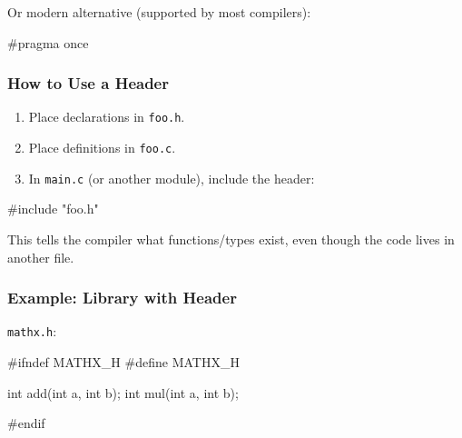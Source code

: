 \documentclass[
  letterpaper,
  DIV=11,
  numbers=noendperiod]{scrreprt}
\newenvironment{Shaded}{\begin{snugshade}}{\end{snugshade}}
\newcommand{\DataTypeTok}[1]{\textcolor[rgb]{0.68,0.00,0.00}{#1}}
\newcommand{\ImportTok}[1]{\textcolor[rgb]{0.00,0.46,0.62}{#1}}
\newcommand{\NormalTok}[1]{\textcolor[rgb]{0.00,0.23,0.31}{#1}}
\newcommand{\OperatorTok}[1]{\textcolor[rgb]{0.37,0.37,0.37}{#1}}
\newcommand{\PreprocessorTok}[1]{\textcolor[rgb]{0.68,0.00,0.00}{#1}}
\providecommand{\tightlist}{%
  \setlength{\itemsep}{0pt}\setlength{\parskip}{0pt}}
\begin{document}
Or modern alternative (supported by most compilers):

\begin{Shaded}
\begin{Highlighting}[]
\PreprocessorTok{\#pragma once}
\end{Highlighting}
\end{Shaded}

\subsubsection{How to Use a Header}\label{how-to-use-a-header}

\begin{enumerate}
\def\labelenumi{\arabic{enumi}.}
\tightlist
\item
  Place declarations in \texttt{foo.h}.
\item
  Place definitions in \texttt{foo.c}.
\item
  In \texttt{main.c} (or another module), include the header:
\end{enumerate}

\begin{Shaded}
\begin{Highlighting}[]
\PreprocessorTok{\#include }\ImportTok{"foo.h"}
\end{Highlighting}
\end{Shaded}

This tells the compiler what functions/types exist, even though the code
lives in another file.

\subsubsection{Example: Library with
Header}\label{example-library-with-header}

\texttt{mathx.h}:

\begin{Shaded}
\begin{Highlighting}[]
\PreprocessorTok{\#ifndef MATHX\_H}
\PreprocessorTok{\#define MATHX\_H}

\DataTypeTok{int}\NormalTok{ add}\OperatorTok{(}\DataTypeTok{int}\NormalTok{ a}\OperatorTok{,} \DataTypeTok{int}\NormalTok{ b}\OperatorTok{);}
\DataTypeTok{int}\NormalTok{ mul}\OperatorTok{(}\DataTypeTok{int}\NormalTok{ a}\OperatorTok{,} \DataTypeTok{int}\NormalTok{ b}\OperatorTok{);}

\PreprocessorTok{\#endif}
\end{Highlighting}
\end{Shaded}
\end{document}
